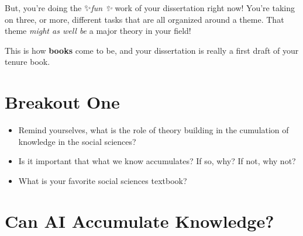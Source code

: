 \documentclass[
  letterpaper,
  DIV=11,
  numbers=noendperiod]{scrreprt}
\begin{document}
But, you're doing the ✨\emph{fun ✨} work of your dissertation right
now! You're taking on three, or more, different tasks that are all
organized around a theme. That theme \emph{might as well be} a major
theory in your field!

This is how \textbf{books} come to be, and your dissertation is really a
first draft of your tenure book.

\section{Breakout One}\label{breakout-one}

\begin{tcolorbox}[enhanced jigsaw, titlerule=0mm, colback=white, toptitle=1mm, toprule=.15mm, bottomtitle=1mm, colframe=quarto-callout-note-color-frame, colbacktitle=quarto-callout-note-color!10!white, bottomrule=.15mm, leftrule=.75mm, opacityback=0, title=\textcolor{quarto-callout-note-color}{\faInfo}\hspace{0.5em}{Breakout 1}, opacitybacktitle=0.6, arc=.35mm, rightrule=.15mm, breakable, coltitle=black, left=2mm]

\begin{itemize}
\item
  Remind yourselves, what is the role of theory building in the
  cumulation of knowledge in the social sciences?
\item
  Is it important that what we know accumulates? If so, why? If not, why
  not?
\item
  What is your favorite social sciences textbook?
\end{itemize}

\end{tcolorbox}

\section{Can AI Accumulate
Knowledge?}\label{can-ai-accumulate-knowledge}
\end{document}
